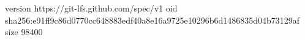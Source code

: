 version https://git-lfs.github.com/spec/v1
oid sha256:e91ff9c86d0770cc648883edf40a8e16a9725e10296b6d1486835d04b73129af
size 98400
